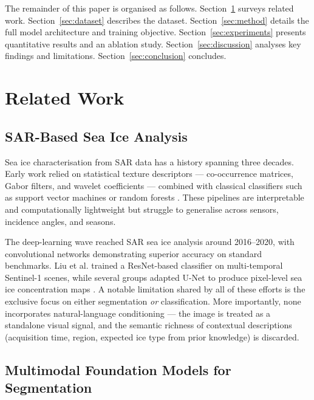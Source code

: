 \documentclass[remotesensing,article,accept,moreauthors,pdftex]{Definitions/mdpi}
\begin{document}
\medskip
The remainder of this paper is organised as follows. Section~\ref{sec:related}
surveys related work. Section~\ref{sec:dataset} describes the dataset.
Section~\ref{sec:method} details the full model architecture and training
objective. Section~\ref{sec:experiments} presents quantitative results and an
ablation study. Section~\ref{sec:discussion} analyses key findings and
limitations. Section~\ref{sec:conclusion} concludes.

\section{Related Work}
\label{sec:related}

\subsection{SAR-Based Sea Ice Analysis}

Sea ice characterisation from SAR data has a history spanning three decades.
Early work relied on statistical texture descriptors — co-occurrence matrices,
Gabor filters, and wavelet coefficients — combined with classical classifiers
such as support vector machines or random forests
\cite{brekke2005sea,leigh2014automated}. These pipelines are interpretable and
computationally lightweight but struggle to generalise across sensors,
incidence angles, and seasons.

The deep-learning wave reached SAR sea ice analysis around 2016--2020, with
convolutional networks demonstrating superior accuracy on standard benchmarks.
Liu et al. \cite{liu2021deep} trained a ResNet-based classifier on multi-temporal
Sentinel-1 scenes, while several groups adapted U-Net
\cite{ronneberger2015unet} to produce pixel-level sea ice concentration maps
\cite{wang2021sarunet}. A notable limitation shared by all of these efforts is
the exclusive focus on either segmentation \emph{or} classification. More
importantly, none incorporates natural-language conditioning — the image is
treated as a standalone visual signal, and the semantic richness of contextual
descriptions (acquisition time, region, expected ice type from prior knowledge)
is discarded.

\subsection{Multimodal Foundation Models for Segmentation}
\end{document}

